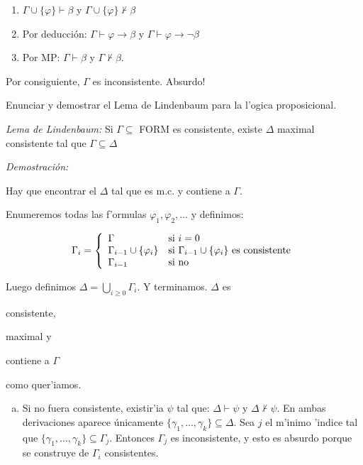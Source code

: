\begin{questions}
\begin{solution}
\begin{enumerate}[a)]
\begin{itemize}
   \begin{enumerate}[1.]
    \item $\Gamma\cup\{\varphi\}\vdash\beta$ y $\Gamma\cup\{\varphi\}\nvdash\beta$
    \item Por deducci\'on: $\Gamma\vdash\varphi\rightarrow\beta$ y $\Gamma\vdash\varphi\rightarrow\neg\beta$
    \item Por MP: $\Gamma\vdash\beta$ y $\Gamma\nvdash\beta$.
   \end{enumerate} 
   
   Por consiguiente, $\Gamma$ es inconsistente. Absurdo!
  \end{itemize}

 \end{enumerate}

\end{solution}


\question Enunciar y demostrar el Lema de Lindenbaum para la l'ogica proposicional.
\begin{solution}

{\it Lema de Lindenbaum:} Si $\Gamma \subseteq$ FORM es consistente, existe $\Delta$ maximal consistente tal que $\Gamma \subseteq \Delta$

{\it Demostraci\'on: }

Hay que encontrar el $\Delta$ tal que es m.c. y contiene a $\Gamma$. 

Enumeremos todas las f'ormulas $\varphi_1, \varphi_2, \dots$ y definimos: 

$$\Gamma_i = \left\{
  \begin{array}{l l}
  \Gamma 				& \text{si } i = 0 \\
  \Gamma_{i-1} \cup \{ \varphi_i \} 	& \text{si } \Gamma_{i-1} \cup \{ \varphi_i \} \text{ es consistente} \\ 
  \Gamma_{i-1} 				& \text{si no} 
  \end{array}
  \right.
  $$

Luego definimos $\Delta = \bigcup_{i\geq 0} \Gamma_i$. Y terminamos. $\Delta$ es \begin{inparaenum}[(a)] \item consistente, \item maximal y \item contiene a $\Gamma$ \end{inparaenum} como quer'iamos.

\begin{enumerate}[(a)]
 \item Si no fuera consistente, existir'ia $\psi$ tal que: $\Delta \vdash \psi$ y $\Delta \nvdash \psi$. En ambas derivaciones aparece \'unicamente $\{ \gamma_1, \dots, \gamma_k \} \subseteq \Delta$. Sea $j$ el m'inimo 'indice tal que $\{ \gamma_1, \dots, \gamma_k \} \subseteq \Gamma_j$. Entonces $\Gamma_j$ es inconsistente, y esto es absurdo porque se construye de $\Gamma_i$ consistentes. 
 

\end{enumerate}
\end{solution}
\end{questions}
